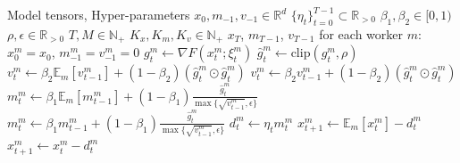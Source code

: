 \documentclass{article}
\begin{document}
\begin{algorithm}[h]
\caption{DES-LOC-ADOPT}
\label{alg:desloc_adopt}
\begin{algorithmic}[1]
\REQUIRE Model tensors, Hyper-parameters
\STATE $x_0, m_{-1}, v_{-1} \in \mathbb{R}^d$ 
\STATE $\{\eta_t\}_{t=0}^{T-1} \subset \mathbb{R}_{>0}$ 
\STATE $\beta_1, \beta_2 \in [0,1)$ 
\STATE $\rho, \epsilon \in \mathbb{R}_{>0}$ 
\STATE $T, M \in \mathbb{N}_+$ 
\STATE $K_x, K_m, K_v \in \mathbb{N}_+$ 
\ENSURE $x_T$, $m_{T-1}$, $v_{T-1}$
\STATE for each worker $m$: $x^m_0 = x_0$, $m^m_{-1} = v^m_{-1} = 0$ 
        \STATE $g^m_t \gets \nabla F(x^m_t; \xi^m_t)$ 
        \STATE $\hat{g}^m_t \gets \text{clip}(g^m_t, \rho)$ 
            \STATE $v^m_t \gets \beta_2 \mathbb{E}_m[v^m_{t-1}] + (1 - \beta_2)(\hat{g}^m_t \odot \hat{g}^m_t)$
        \ELSE
            \STATE $v^m_t \gets \beta_2 v^m_{t-1} + (1 - \beta_2)(\hat{g}^m_t \odot \hat{g}^m_t)$
        \ENDIF
            \STATE $m^m_t \gets \beta_1 \mathbb{E}_m[m^m_{t-1}] + (1 - \beta_1) \frac{\hat{g}^m_t}{\max\{\sqrt{v^m_{t-1}}, \epsilon\}}$
        \ELSE
            \STATE $m^m_t \gets \beta_1 m^m_{t-1} + (1 - \beta_1) \frac{\hat{g}^m_t}{\max\{\sqrt{v^m_{t-1}}, \epsilon\}}$ 
        \ENDIF
        \STATE $d^m_t \gets \eta_t m^m_t$
            \STATE $x^m_{t+1} \gets \mathbb{E}_m[x^m_t] - d^m_t$
        \ELSE
            \STATE $x^m_{t+1} \gets x^m_t - d^m_t$
        \ENDIF
    \ENDFOR
\ENDFOR
\end{algorithmic}
\end{algorithm}


\end{document}
